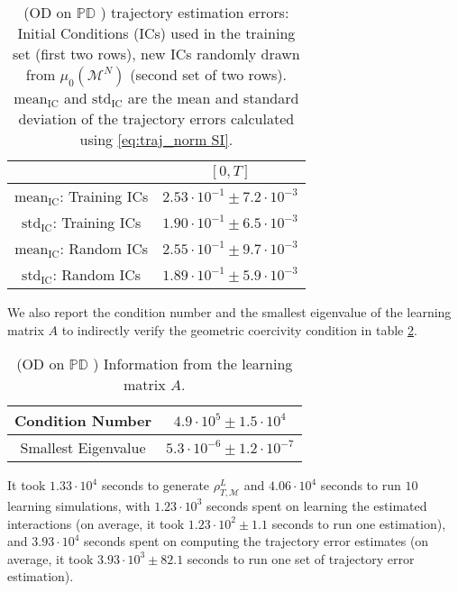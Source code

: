 \documentclass[11pt]{article}
\newcommand{\mM}{\mathcal{M}}
\newcommand{\probIC}{\mu_0}
\newcommand{\muX}{\probIC(\mM^N)}
\begin{document}
\begin{table}[H]
\centering
\small{\begin{tabular}{| c || c |} 
\hline
                                        & $[0, T]$                                \\
\hline
$\text{mean}_{\text{IC}}$: Training ICs & $2.53 \cdot 10^{-1} \pm 7.2 \cdot 10^{-3}$ \\
\hline
$\text{std}_{\text{IC}}$:  Training ICs & $1.90 \cdot 10^{-1} \pm 6.5 \cdot 10^{-3}$ \\
\hline   
\hline         
$\text{mean}_{\text{IC}}$: Random ICs   & $2.55 \cdot 10^{-1} \pm 9.7 \cdot 10^{-3}$ \\
\hline
$\text{std}_{\text{IC}}$:  Random ICs   & $1.89 \cdot 10^{-1} \pm 5.9 \cdot 10^{-3}$ \\
\hline   
\end{tabular}}
\caption{(OD on  $ \mathbb{PD} $ ) trajectory estimation errors: Initial Conditions (ICs) used in the training set (first two rows), new ICs randomly drawn from $\muX$ (second set of two rows).  $\text{mean}_{\text{IC}}$ and $\text{std}_{\text{IC}}$ are the mean and standard deviation of the trajectory errors calculated using \eqref{eq:traj_norm SI}.}
\label{tab:OD_on_PD_traj_err}
\end{table}
We also report the condition number and the smallest eigenvalue of the learning matrix $A$ to indirectly verify the geometric coercivity condition in table \ref{tab:OD_on_PD_coer}.
\begin{table}[H]
\centering
\small{\begin{tabular}{ c || c } 
Condition Number    & $4.9 \cdot 10^{5} \pm 1.5 \cdot 10^{4}$ \\ 
\hline
Smallest Eigenvalue & $5.3 \cdot 10^{-6} \pm 1.2 \cdot 10^{-7}$
\end{tabular}}
\caption{(OD on  $ \mathbb{PD} $ ) Information from the learning matrix $A$.}
\label{tab:OD_on_PD_coer}
\end{table}
It took $1.33 \cdot 10^{4}$ seconds to generate $\rho_{T, \mM}^L$ and $4.06 \cdot 10^{4}$ seconds to run $10$ learning simulations, with $1.23 \cdot 10^{3}$ seconds spent on learning the estimated interactions (on average, it took $1.23 \cdot 10^{2} \pm 1.1$ seconds to run one estimation), and $3.93 \cdot 10^{4}$ seconds spent on computing the trajectory error estimates (on average, it took $3.93 \cdot 10^{3} \pm 82.1$ seconds to run one set of trajectory error estimation).
%
\end{document}
